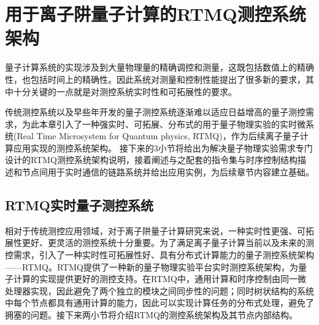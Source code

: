 
\chapter[用于离子阱量子计算的RTMQ测控系统架构]{用于离子阱量子计算的RTMQ测控系统架构\label{section:fpga_rtmq}}


量子计算系统的实现涉及到大量物理量的精确调控和测量，这既包括数值上的精确性，也包括时间上的精确性。因此系统对测量和控制性能提出了很多新的要求，其中十分关键的一点就是对测控系统实时性和可拓展性的要求。

传统测控系统以及早些年开发的量子测控系统逐渐难以适应日益增高的量子测控需求，为此本章引入了一种强实时、可拓展、分布式的用于量子物理实验的实时微系统(Real Time Microsystem for Quantum physics, RTMQ)，作为后续离子量子计算应用实现的测控系统架构。
接下来的3小节将给出为解决量子物理实验需求专门设计的RTMQ测控系统架构说明，接着阐述与之配套的指令集与时序控制结构描述和节点间用于实时通信的链路系统并给出应用实例，为后续章节内容建立基础。




\section[RTMQ实时量子测控系统]{RTMQ实时量子测控系统\label{section:rtmq_structure}}

相对于传统测控应用领域，对于离子阱量子计算研究来说，一种实时性更强、可拓展性更好、更灵活的测控系统十分重要。为了满足离子量子计算当前以及未来的测控需求，引入了一种实时性可拓展性好、具有分布式计算能力的量子测控系统架构——RTMQ。RTMQ提供了一种新的量子物理实验平台实时测控系统架构，为量子计算的实现提供更好的测控支持。在RTMQ中，通用计算和时序控制由同一微处理器实现，因此避免了两个独立的模块之间同步性的问题；同时树状结构的系统中每个节点都具有通用计算的能力，因此可以实现计算任务的分布式处理，避免了拥塞的问题\cite[]{junhua01}。接下来两小节将介绍RTMQ的测控系统架构及其节点内部结构。


